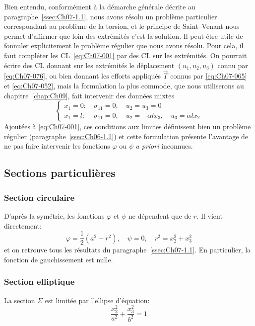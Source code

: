 Bien entendu, conformément à la démarche générale décrite au paragraphe~\ref{ssec:Ch07-1.1}, nous avons résolu un problème particulier correspondant au problème de la torsion, et le principe de Saint--Venant nous permet d'affirmer que loin des extrémités c'est la solution.
Il peut être utile de fonnuler explicitement le problème régulier que nous avons résolu.
Pour cela, il faut compléter les CL~\eqref{eq:Ch07-001} par des CL sur les extrémités.
On pourrait écrire des CL donnant sur les extrémités le dêplacement $(u_1, u_2, u_3)$ connu par \eqref{eq:Ch07-076}, ou bien donnant les efforts appliqués $\vec{T}$ connus par \eqref{eq:Ch07-065} et \eqref{eq:Ch07-052}, mais la formulation la plus commode, que nous utiliserons au chapitre~\ref{chap:Ch09}, fait intervenir des données mixtes
\begin{equation}
    \left\{
    \begin{aligned}
        x_1 = 0 : &\ \sigma_{11} = 0, \quad u_2 = u_3 = 0 \\
        x_1 = l : &\ \sigma_{11} = 0, \quad u_2 = -\alpha l x_3,\quad u_3 = \alpha l x_2
    \end{aligned}
    \right.
    \label{eq:Ch07-079} 
\end{equation}
Ajoutées à \eqref{eq:Ch07-001}, ces conditions aux limites définissent bien un problème régulier (paragraphe~\ref{ssec:Ch06-1.1}) et cette formulation présente l'avantage de ne pas faire intervenir les fonctions $\varphi$ ou $\psi$ \textit{a priori} inconnues. 

\subsection{Sections particulières} \label{ssec:Ch07-2.4}
\subsubsection{Section circulaire}
D'après la symétrie, les fonctions $\varphi$ et $\psi$ ne dépendent que de $r$.
Il vient directement: 
\begin{equation}
    \varphi =\frac{1}{2}\left( a^2 - r^2 \right), \quad \psi = 0, \quad r^2 = x_2^2 + x_3^2 
    \label{eq:Ch07-080}
\end{equation}
et on retrouve tous les résultats du paragraphe~\ref{ssec:Ch07-1.1}.
En particulier, la fonction de gauchissement est nulle.
\subsubsection{Section elliptique}
La section $\Sigma$ est limitée par l'ellipse d'équation:
    \begin{equation}
        \frac{x_2^2}{a^2} + \frac{x_3^2}{b^2} = 1
        \label{eq:Ch07-081}
    \end{equation}

